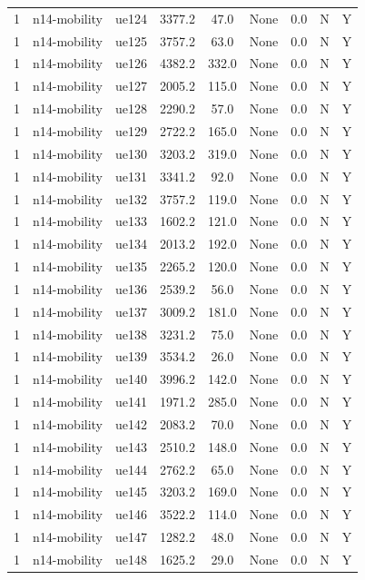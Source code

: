 \begin{table}[ht]
\begin{tabular}{|c|c|c|c|c|c|c|c|c|}
1 & n14-mobility & ue124 & 3377.2 & 47.0 & None & 0.0 & N & Y \\
1 & n14-mobility & ue125 & 3757.2 & 63.0 & None & 0.0 & N & Y \\
1 & n14-mobility & ue126 & 4382.2 & 332.0 & None & 0.0 & N & Y \\
1 & n14-mobility & ue127 & 2005.2 & 115.0 & None & 0.0 & N & Y \\
1 & n14-mobility & ue128 & 2290.2 & 57.0 & None & 0.0 & N & Y \\
1 & n14-mobility & ue129 & 2722.2 & 165.0 & None & 0.0 & N & Y \\
1 & n14-mobility & ue130 & 3203.2 & 319.0 & None & 0.0 & N & Y \\
1 & n14-mobility & ue131 & 3341.2 & 92.0 & None & 0.0 & N & Y \\
1 & n14-mobility & ue132 & 3757.2 & 119.0 & None & 0.0 & N & Y \\
1 & n14-mobility & ue133 & 1602.2 & 121.0 & None & 0.0 & N & Y \\
1 & n14-mobility & ue134 & 2013.2 & 192.0 & None & 0.0 & N & Y \\
1 & n14-mobility & ue135 & 2265.2 & 120.0 & None & 0.0 & N & Y \\
1 & n14-mobility & ue136 & 2539.2 & 56.0 & None & 0.0 & N & Y \\
1 & n14-mobility & ue137 & 3009.2 & 181.0 & None & 0.0 & N & Y \\
1 & n14-mobility & ue138 & 3231.2 & 75.0 & None & 0.0 & N & Y \\
1 & n14-mobility & ue139 & 3534.2 & 26.0 & None & 0.0 & N & Y \\
1 & n14-mobility & ue140 & 3996.2 & 142.0 & None & 0.0 & N & Y \\
1 & n14-mobility & ue141 & 1971.2 & 285.0 & None & 0.0 & N & Y \\
1 & n14-mobility & ue142 & 2083.2 & 70.0 & None & 0.0 & N & Y \\
1 & n14-mobility & ue143 & 2510.2 & 148.0 & None & 0.0 & N & Y \\
1 & n14-mobility & ue144 & 2762.2 & 65.0 & None & 0.0 & N & Y \\
1 & n14-mobility & ue145 & 3203.2 & 169.0 & None & 0.0 & N & Y \\
1 & n14-mobility & ue146 & 3522.2 & 114.0 & None & 0.0 & N & Y \\
1 & n14-mobility & ue147 & 1282.2 & 48.0 & None & 0.0 & N & Y \\
1 & n14-mobility & ue148 & 1625.2 & 29.0 & None & 0.0 & N & Y \\

\end{tabular}
\end{table}
